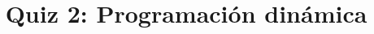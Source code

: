 \documentclass{doc}
\title{Quiz 2: Programación dinámica}
\begin{document}
\makedocheader
\quizidentification

\quizback
\quizback
\end{document}
